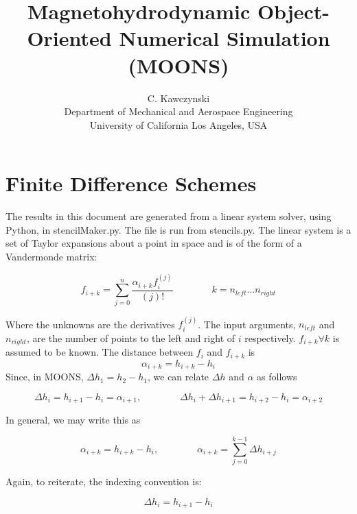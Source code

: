 \documentclass[landscape]{article}
\begin{document}
\doublespacing
\title{Magnetohydrodynamic Object-Oriented Numerical Simulation (MOONS)}
\author{C. Kawczynski \\
Department of Mechanical and Aerospace Engineering \\
University of California Los Angeles, USA\\}
\maketitle

\section{Finite Difference Schemes}

The results in this document are generated from a linear system solver, using Python, in stencilMaker.py. The file is run from stencils.py. The linear system is a set of Taylor expansions about a point in space and is of the form of a Vandermonde matrix:

\begin{equation}
	f_{i+k}
	=
	\sum_{j=0}^n
	\frac{\alpha_{i+k} f_{i}^{(j)}}{(j)!}
	\qquad \qquad
	k = n_{left} \dots n_{right}
\end{equation}

Where the unknowns are the derivatives $f_i^{(j)}$. The input arguments, $n_{left}$ and $n_{right}$, are the number of points to the left and right of $i$ respectively. $f_{i+k}\forall k$ is assumed to be known. The distance between $f_{i}$ and $f_{i+k}$ is
\begin{equation}
	\alpha_{i+k} 
	=
	h_{i+k} - h_{i}
\end{equation}
Since, in MOONS, $\Delta h_1 = h_2 - h_1$, we can relate $\Delta h$ and $\alpha$ as follows

\begin{equation}
	\Delta h_{i} = h_{i+1} - h_{i} = \alpha_{i+1}
	,\qquad \qquad
	\Delta h_{i} + \Delta h_{i+1} = h_{i+2} - h_{i} = \alpha_{i+2}
\end{equation}

In general, we may write this as

\begin{equation}
	\alpha_{i+k} = h_{i+k} - h_{i}
	,\qquad \qquad
	\alpha_{i+k} = \sum_{j=0}^{k-1} \Delta h_{i+j}
\end{equation}

Again, to reiterate, the indexing convention is:

\begin{equation}
	\boxed{
	\Delta h_{i}
	=
	h_{i+1} - h_{i}
	}
\end{equation}
\end{document}
